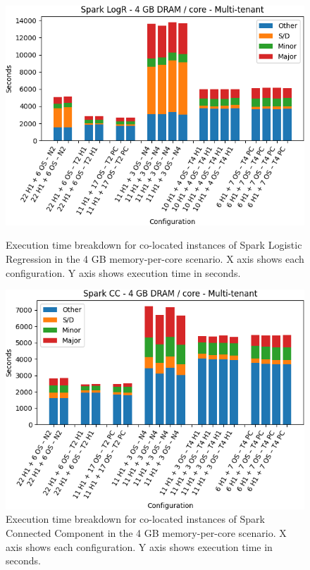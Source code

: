 \begin{figure}[thbp]
        \centering
    \includegraphics[width=\linewidth]{./fig/logr64.png}
    \caption{Execution time breakdown for co-located instances of Spark
    Logistic Regression in the 4 GB memory-per-core scenario. X axis shows each configuration.
	Y axis shows execution time in seconds.}
    \label{fig:logr64}

    \includegraphics[width=\linewidth]{./fig/cc64.png}
    \caption{Execution time breakdown for co-located instances of Spark
    Connected Component in the 4 GB memory-per-core scenario. X axis shows each configuration.
	Y axis shows execution time in seconds.}
    \label{fig:cc64}
\end{figure}


